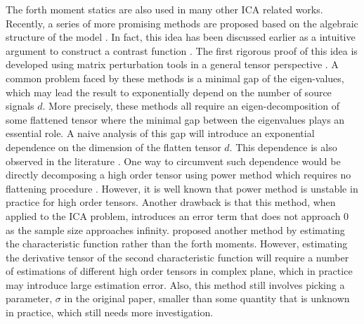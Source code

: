 \documentclass[twoside]{article}
\theoremstyle{definition}
\begin{document}
The forth moment statics are also used in many other ICA related works. 
Recently, a series of more promising methods are proposed based on the algebraic structure of the model \citep{hsu2013learning,anandkumar2012tensordecomposition,anandkumar2012method}. 
In fact, this idea has been discussed earlier as a intuitive argument to construct a contrast function \citep{cardoso1999high}. 
The first rigorous proof of this idea is developed using matrix perturbation tools in a general tensor perspective \citep{anandkumar2012tensordecomposition,anandkumar2012method,goyal2014fourier}. 
A common problem faced by these methods is a minimal gap of the eigen-values, which may lead the result to exponentially depend on the number of source signals $d$.
More precisely, these methods all require an eigen-decomposition of some flattened tensor where the minimal gap between the eigenvalues plays an essential role. 
A naive analysis of this gap will introduce an exponential dependence on the dimension of the flatten tensor $d$. 
This dependence is also observed in the literature \citep{cardoso1999high,goyal2014fourier}.
One way to circumvent such dependence would be directly decomposing a high order tensor using power method which requires no flattening procedure \citep{anandkumar2014guaranteed}. 
However, it is well known that power method is unstable in practice for high order tensors. 
Another drawback is that this method, when applied to the ICA problem, introduces an error term that does not approach 0 as the sample size approaches infinity. 
\citet{goyal2014fourier} proposed another method by estimating the  characteristic function rather than the forth moments. 
However, estimating the derivative tensor of the second characteristic function will require a number of estimations of different high order tensors in complex plane, which in practice may introduce large estimation error. 
Also, this method still involves picking a parameter, $\sigma$ in the original paper, smaller than some quantity that is unknown in practice, which still needs more investigation.
 
\end{document}
